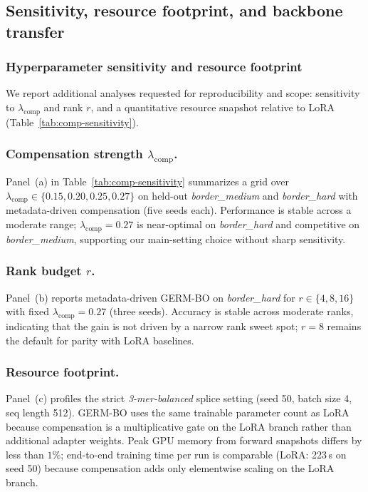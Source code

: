 \documentclass[12pt,letterpaper]{article}
\newcommand{\splitname}[1]{\textit{#1}}
\begin{document}
\subsection*{Sensitivity, resource footprint, and backbone transfer}



\subsubsection*{Hyperparameter sensitivity and resource footprint}

We report additional analyses requested for reproducibility and scope: sensitivity to $\lambda_{\mathrm{comp}}$ and rank $r$, and a quantitative resource snapshot relative to LoRA (Table~\ref{tab:comp-sensitivity}).

\subsubsection*{Compensation strength $\lambda_{\mathrm{comp}}$.}
Panel~(a) in Table~\ref{tab:comp-sensitivity} summarizes a grid over $\lambda_{\mathrm{comp}} \in \{0.15,0.20,0.25,0.27\}$ on held-out \splitname{border\_medium} and \splitname{border\_hard} with metadata-driven compensation (five seeds each). Performance is stable across a moderate range; $\lambda_{\mathrm{comp}}=0.27$ is near-optimal on \splitname{border\_hard} and competitive on \splitname{border\_medium}, supporting our main-setting choice without sharp sensitivity.

\subsubsection*{Rank budget $r$.}
Panel~(b) reports metadata-driven GERM-BO on \splitname{border\_hard} for $r \in \{4,8,16\}$ with fixed $\lambda_{\mathrm{comp}}=0.27$ (three seeds). Accuracy is stable across moderate ranks, indicating that the gain is not driven by a narrow rank sweet spot; $r=8$ remains the default for parity with LoRA baselines.

\subsubsection*{Resource footprint.}
Panel~(c) profiles the strict \splitname{3-mer-balanced} splice setting (seed 50, batch size 4, seq length 512). GERM-BO uses the same trainable parameter count as LoRA because compensation is a multiplicative gate on the LoRA branch rather than additional adapter weights. Peak GPU memory from forward snapshots differs by less than $1\%$; end-to-end training time per run is comparable (LoRA: 223\,s on seed 50) because compensation adds only elementwise scaling on the LoRA branch.
\end{document}
